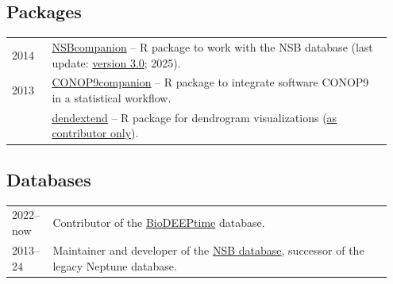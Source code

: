\documentclass[11pt, a4paper]{article}
\begin{document}
\subsection{Packages}
\begin{longtable}{@{}p{0.1\linewidth} >{\small}P{0.85\linewidth}@{}}
2014 & \href{http://github.com/plannapus/NSBcompanion}{NSBcompanion} -- R package to work with the NSB database (last update: \href{http://doi.org/10.5281/zenodo.3408197}{version 3.0}; 2025).\\
2013 & \href{http://github.com/plannapus/CONOP9companion}{CONOP9companion} -- R package to integrate software CONOP9 in a statistical workflow.\\
     & \href{https://cran.r-project.org/web/packages/dendextend/index.html}{dendextend} -- R package for dendrogram visualizations (\underline{as contributor only}).\\
\end{longtable}
\subsection{Databases}
\begin{longtable}{@{}p{0.1\linewidth} >{\small}P{0.85\linewidth}@{}}
2022--now & Contributor of the \href{https://zenodo.org/record/7504616}{BioDEEPtime} database.\\
2013--24 & Maintainer and developer of the \href{https://web.archive.org/web/20230925131822/https://nsb.mfn-berlin.de/}{NSB database}, successor of the legacy Neptune database.\\
\end{longtable}
\end{document}
